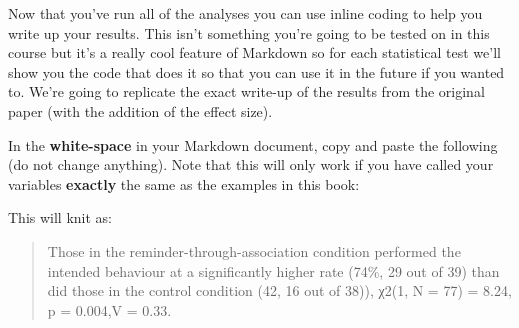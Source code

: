\documentclass[]{book}
\newenvironment{Shaded}{\begin{snugshade}}{\end{snugshade}}
\newcommand{\ControlFlowTok}[1]{\textcolor[rgb]{0.13,0.29,0.53}{\textbf{#1}}}
\newcommand{\DataTypeTok}[1]{\textcolor[rgb]{0.13,0.29,0.53}{#1}}
\newcommand{\ErrorTok}[1]{\textcolor[rgb]{0.64,0.00,0.00}{\textbf{#1}}}
\newcommand{\KeywordTok}[1]{\textcolor[rgb]{0.13,0.29,0.53}{\textbf{#1}}}
\newcommand{\NormalTok}[1]{#1}
\newcommand{\OperatorTok}[1]{\textcolor[rgb]{0.81,0.36,0.00}{\textbf{#1}}}
\newcommand{\StringTok}[1]{\textcolor[rgb]{0.31,0.60,0.02}{#1}}
\begin{document}
Now that you've run all of the analyses you can use inline coding to help you write up your results. This isn't something you're going to be tested on in this course but it's a really cool feature of Markdown so for each statistical test we'll show you the code that does it so that you can use it in the future if you wanted to. We're going to replicate the exact write-up of the results from the original paper (with the addition of the effect size).

In the \textbf{white-space} in your Markdown document, copy and paste the following (do not change anything). Note that this will only work if you have called your variables \textbf{exactly} the same as the examples in this book:

\begin{Shaded}
\end{Shaded}

This will knit as:

\begin{quote}
Those in the reminder-through-association condition performed the intended behaviour at a significantly higher rate (74\%, 29 out of 39) than did those in the control condition (42, 16 out of 38)), χ2(1, N = 77) = 8.24, p = 0.004,V = 0.33.
\end{quote}
\end{document}
